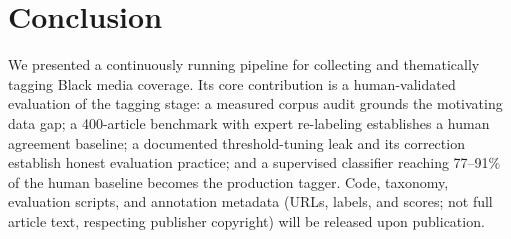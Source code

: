 \documentclass[letterpaper]{article}
\begin{document}
\section{Conclusion}

We presented a continuously running pipeline for collecting and
thematically tagging Black media coverage. Its core contribution is a
human-validated evaluation of the tagging stage: a measured corpus audit
grounds the motivating data gap; a 400-article benchmark with expert
re-labeling establishes a human agreement baseline; a documented
threshold-tuning leak and its correction establish honest evaluation
practice; and a supervised classifier reaching 77--91\% of the human
baseline becomes the production tagger. Code, taxonomy, evaluation
scripts, and annotation metadata (URLs, labels, and scores; not full
article text, respecting publisher copyright) will be released upon
publication.


\end{document}

